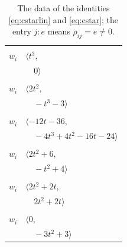 \documentclass[11pt]{article}
\begin{document}
\begingroup\scriptsize
\setlength{\LTcapwidth}{\textwidth}
\begin{longtable}{@{}ll@{}}
\caption{The data of the identities \eqref{eq:cstarlin} and \eqref{eq:cstar}; the entry $j{:}e$ means $\rho_{ij}=e\neq0$.}\label{tab:cstar}\\
\hline\endfirsthead\hline\endhead\hline\endfoot
\multicolumn{2}{@{}p{0.97\textwidth}@{}}{$i=0$, $D_i=2$, $\rho_{ij}$: $17{:}1, \allowbreak 34{:}2, \allowbreak 35{:}2$}\\
$w_i$ & $\langle t^{3},$\\
 & $\quad 0\rangle$\\
\addlinespace[2pt]
\multicolumn{2}{@{}p{0.97\textwidth}@{}}{$i=1$, $D_i=1$, $\rho_{ij}$: $13{:}1, \allowbreak 14{:}1, \allowbreak 20{:}1, \allowbreak 27{:}1, \allowbreak 28{:}2, \allowbreak 29{:}1, \allowbreak 34{:}1$}\\
$w_i$ & $\langle 2t^{2},$\\
 & $\quad -t^{3}-3\rangle$\\
\addlinespace[2pt]
\multicolumn{2}{@{}p{0.97\textwidth}@{}}{$i=2$, $D_i=1$, $\rho_{ij}$: $11{:}2, \allowbreak 12{:}1, \allowbreak 14{:}1, \allowbreak 15{:}1, \allowbreak 17{:}1, \allowbreak 19{:}2, \allowbreak 20{:}2, \allowbreak 23{:}1, \allowbreak 24{:}2, \allowbreak 32{:}2, \allowbreak 33{:}2, \allowbreak 34{:}1$}\\
$w_i$ & $\langle -12t-36,$\\
 & $\quad -4t^{3}+4t^{2}-16t-24\rangle$\\
\addlinespace[2pt]
\multicolumn{2}{@{}p{0.97\textwidth}@{}}{$i=3$, $D_i=1$, $\rho_{ij}$: $10{:}1, \allowbreak 15{:}1, \allowbreak 32{:}1, \allowbreak 35{:}2$}\\
$w_i$ & $\langle 2t^{2}+6,$\\
 & $\quad -t^{2}+4\rangle$\\
\addlinespace[2pt]
\multicolumn{2}{@{}p{0.97\textwidth}@{}}{$i=4$, $D_i=1$, $\rho_{ij}$: $12{:}1, \allowbreak 20{:}1, \allowbreak 22{:}1, \allowbreak 28{:}2, \allowbreak 30{:}1, \allowbreak 36{:}2$}\\
$w_i$ & $\langle 2t^{2}+2t,$\\
 & $\quad 2t^{2}+2t\rangle$\\
\addlinespace[2pt]
\multicolumn{2}{@{}p{0.97\textwidth}@{}}{$i=5$, $D_i=1$, $\rho_{ij}$: $20{:}2, \allowbreak 24{:}1, \allowbreak 26{:}2, \allowbreak 28{:}1, \allowbreak 33{:}2$}\\
$w_i$ & $\langle 0,$\\
 & $\quad -3t^{2}+3\rangle$\\

\end{longtable}
\end{document}
